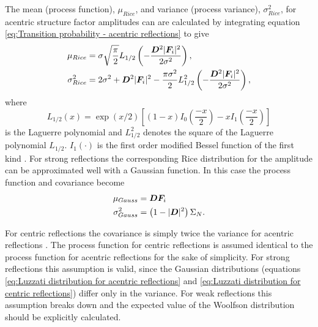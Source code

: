 The mean (process function), $\mu_{Rice}$, and variance (process variance), $\sigma_{Rice}^2$, for acentric structure factor amplitudes can are calculated by integrating equation \ref{eq:Transition probability - acentric reflections} to give
\begin{align}
    \mu_{Rice} &= \sigma \sqrt{\frac{\pi}{2}} L_{1/2} \left(-\frac{\boldsymbol{D}^2|\boldsymbol{F}_i|^2}{2\sigma^2}\right), \label{eq:Process function - mean of rice distribution}\\
    \sigma_{Rice}^2 &= 2\sigma^2 + \boldsymbol{D}^2|\boldsymbol{F}_i|^2 - \frac{\pi \sigma^2}{2} L_{1/2}^2 \left(-\frac{\boldsymbol{D}^2|\boldsymbol{F}_i|^2}{2\sigma^2}\right), \label{eq:Process covariance - variance of rice distribution}
\end{align}
where
\begin{equation}
    L_{1/2}(x) = \exp \left( x/2 \right) \left[ (1-x) I_0 \left( \frac{-x}{2} \right) - xI_1 \left( \frac{-x}{2} \right) \right] \label{eq:Laguerre polynomial}
\end{equation}
is the Laguerre polynomial and $ L_{1/2}^2 $ denotes the square of the Laguerre polynomial $ L_{1/2} $. $I_1(\cdot)$ is the first order modified Bessel function of the first kind \cite{den2014data}.
For strong reflections the corresponding Rice distribution for the amplitude can be approximated well with a Gaussian function.
In this case the process function and covariance become
\begin{align}
    \mu_{Gauss} &= \boldsymbol{D}\boldsymbol{F}_i \label{eq:Process function - mean of Gaussian distribution}\\
    \sigma_{Gauss}^2 &= \left(1 - |\boldsymbol{D}|^2 \right)\Sigma_N. \label{eq:Process covariance - variance of Gaussian distribution}
\end{align}

For centric reflections the covariance is simply twice the variance for acentric reflections \cite{terwilliger1996bayesian}.
The process function for centric reflections is assumed identical to the process function for acentric reflections for the sake of simplicity.
For strong reflections this assumption is valid, since the Gaussian distributions (equations \ref{eq:Luzzati distribution for acentric reflections} and \ref{eq:Luzzati distribution for centric reflections}) differ only in the variance.
For weak reflections this assumption breaks down and the expected value of the Woolfson distribution should be explicitly calculated.


